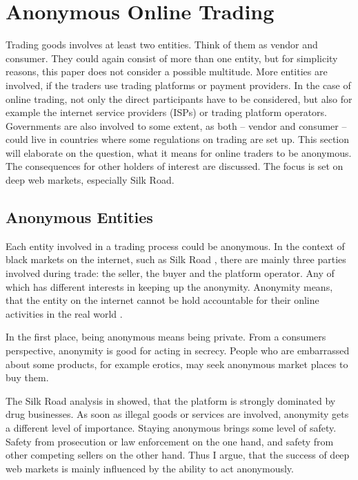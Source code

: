 \section{Anonymous Online Trading}
\label{trading}

Trading goods involves at least two entities. Think of them as vendor and consumer. They could again consist of more than one entity, but for simplicity reasons, this paper does not consider a possible multitude. More entities are involved, if the traders use trading platforms or payment providers. In the case of online trading, not only the direct participants have to be considered, but also for example the internet service providers (ISPs) or trading platform operators. Governments are also involved to some extent, as both -- vendor and consumer -- could live in countries where some regulations on trading are set up.
This section will elaborate on the question, what it means for online traders to be anonymous. The consequences for other holders of interest are discussed. The focus is set on deep web markets, especially Silk Road.

\subsection{Anonymous Entities}

Each entity involved in a trading process could be anonymous. In the context of black markets on the internet, such as Silk Road \cite{silkroad2013}, there are mainly three parties involved during trade: the seller, the buyer and the platform operator. Any of which has different interests in keeping up the anonymity. Anonymity means, that the entity on the internet cannot be hold accountable for their online activities in the real world \cite{accountability2014}.

In the first place, being anonymous means being private. From a consumers perspective, anonymity is good for acting in secrecy. People who are embarrassed about some products, for example erotics, may seek anonymous market places to buy them.

The Silk Road analysis in \cite{silkroad2013} showed, that the platform is strongly dominated by drug businesses. As soon as illegal goods or services are involved, anonymity gets a different level of importance. Staying anonymous brings some level of safety. Safety from prosecution or law enforcement on the one hand, and safety from other competing sellers on the other hand. Thus I argue, that the success of deep web markets is mainly influenced by the ability to act anonymously.


